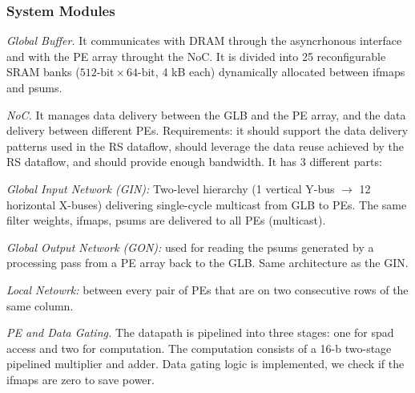 \subsubsection{System Modules}
\begin{dashlist}
    \item \textit{Global Buffer.} It communicates with DRAM through the asyncrhonous interface and with the PE array throught the NoC. It is divided into 25 reconfigurable SRAM banks ($512\text{-bit} \times 64\text{-bit}$, 4 kB each) dynamically allocated between ifmaps and psums.
    \item \textit{NoC.} It manages data delivery between the GLB and the PE array, and the data delivery between different PEs. Requirements: it should support the data delivery patterns used in the RS dataflow, should leverage the data reuse achieved by the RS dataflow, and should provide enough bandwidth. It has 3 different parts:
    \begin{dashlist}
        \item \textit{Global Input Network (GIN):} 
        Two-level hierarchy (1 vertical Y-bus $\to$ 12 horizontal X-buses) delivering single-cycle multicast from GLB to PEs. The same filter weights, ifmaps, psums are delivered to all PEs (multicast).
        \item \textit{Global Output Network (GON):} used for reading the psums generated by a processing pass from a PE array back to the GLB. Same architecture as the GIN.
        \item \textit{Local Netowrk:} between every pair of PEs that are on two consecutive rows of the same column.
    \end{dashlist}
    \item \textit{PE and Data Gating.} The datapath is pipelined into three stages: one for spad access and two for computation. The computation consists of a 16-b two-stage pipelined multiplier and adder. Data gating logic is implemented, we check if the ifmaps are zero to save power.
\end{dashlist}



